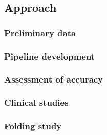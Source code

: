 \documentclass[11pt]{nih}
\begin{document}
\subsection{Approach}

\subsubsection{Preliminary data}

\subsubsection{Pipeline development}

\subsubsection{Assessment of accuracy}

\subsubsection{Clinical studies}

\subsubsection{Folding study}





 

\appendix
\end{document}
